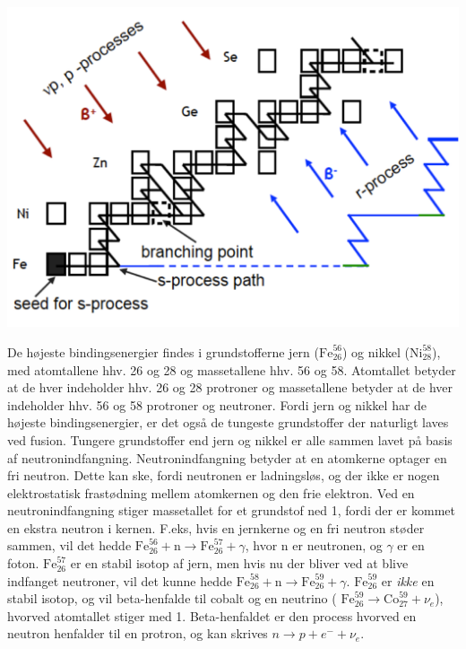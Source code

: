 \documentclass[twocolumn]{article}
\begin{document}
\begin{center}
\includegraphics[width=\columnwidth]{r-process2.pdf}
\end{center}

De højeste bindingsenergier findes i grundstofferne jern ($\mathrm{Fe}_{26}^{56}$) og nikkel ($\mathrm{Ni}_{28}^{58}$), med atomtallene hhv. 26 og 28 og massetallene hhv. 56 og 58. Atomtallet betyder at de hver indeholder hhv. 26 og 28 protroner og massetallene betyder at de hver indeholder hhv. 56 og 58 protroner og neutroner. Fordi jern og nikkel har de højeste bindingsenergier, er det også de tungeste grundstoffer der naturligt laves ved fusion. Tungere grundstoffer end jern og nikkel er alle sammen lavet på basis af neutronindfangning. Neutronindfangning betyder at en atomkerne optager en fri neutron. Dette kan ske, fordi neutronen er ladningsløs, og der ikke er nogen elektrostatisk frastødning mellem atomkernen og den frie elektron. Ved en neutronindfangning stiger massetallet for et grundstof ned 1, fordi der er kommet en ekstra neutron i kernen. F.eks, hvis en jernkerne og en fri neutron støder sammen, vil det hedde $\mathrm{Fe}_{26}^{56} + \mathrm{n} \rightarrow \mathrm{Fe}_{26}^{57} + \gamma$, hvor n er neutronen, og $\gamma$ er en foton. $\mathrm{Fe}_{26}^{57}$ er en stabil isotop af jern, men hvis nu der bliver ved at blive indfanget neutroner, vil det kunne hedde $\mathrm{Fe}_{26}^{58} + \mathrm{n} \rightarrow \mathrm{Fe}_{26}^{59} + \gamma$. $\mathrm{Fe}_{26}^{59}$ er \textit{ikke} en stabil isotop, og vil beta-henfalde til cobalt og en neutrino ( $\mathrm{Fe}_{26}^{59} \rightarrow  \mathrm{Co}_{27}^{59} + \nu_e$), hvorved atomtallet stiger med 1. Beta-henfaldet er den process hvorved en neutron henfalder til en protron, og kan skrives $n \rightarrow p + e^- + \nu_e$. 
\end{document}
